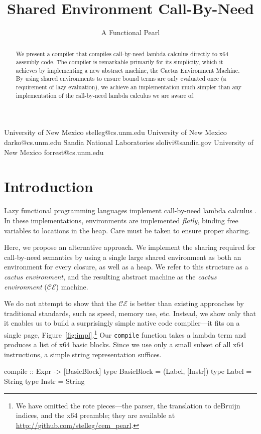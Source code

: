 \documentclass[preprint]{sigplanconf}
\begin{document}
\title{Shared Environment Call-By-Need}
\subtitle{A Functional Pearl}

           {University of New Mexico}
           {stelleg@cs.unm.edu}
           {University of New Mexico}
           {darko@cs.unm.edu}
           {Sandia National Laboratories}
           {slolivi@sandia.gov}
           {University of New Mexico}
           {forrest@cs.unm.edu}

\maketitle

\begin{abstract}
We present a compiler that compiles call-by-need lambda calculus directly to
x64 assembly code. The compiler is remarkable primarily for its simplicity,
which it achieves by implementing a new abstract machine, the Cactus
Environment Machine. By using shared environments to ensure bound terms are only
evaluated once (a requirement of lazy evaluation), we achieve an implementation
much simpler than any implementation of the call-by-need
lambda calculus we are aware of.
\end{abstract}

\section{Introduction} \label{sec:intro}
Lazy functional programming languages implement call-by-need lambda calculus
\cite{ariola1995call}. In these implementations, environments are implemented
\emph{flatly}, binding free variables to locations in the heap. Care must be
taken to ensure proper sharing.  

Here, we propose an alternative approach. 
We implement the
sharing required for call-by-need semantics by using a single large shared
environment as both an environment for every closure, as well as a heap. We
refer to this structure as a \emph{cactus environment}, and the resulting
abstract machine as the \emph{cactus environment} ($\mathcal{CE}$) machine.

We do not attempt to show that the $\mathcal{CE}$ is better than existing
approaches by traditional standards, such as speed, memory use, etc. Instead, we
show only that it enables us to build a surprisingly simple native code
compiler---it fits on a single page, Figure~\ref{fig:impl}.\footnote{We have omitted the rote pieces---the parser, the translation to deBruijn indices, and the x64 preamble;
they are available at
\url{http://github.com/stelleg/cem_pearl}.}
Our \texttt{compile} function takes a lambda term and produces a
list of x64 basic blocks. Since we use only a small subset of all x64
instructions, a simple string representation suffices.
\begin{code}
compile :: Expr -> [BasicBlock]
type BasicBlock = (Label, [Instr])
type Label = String
type Instr = String
\end{code}
\end{document}
